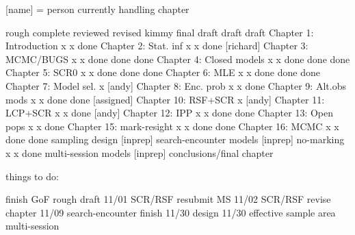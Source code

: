 [name] = person currently handling chapter


                          rough   complete reviewed  revised kimmy final 
                          draft    draft                           draft
Chapter 1: Introduction       x       x     done    
Chapter 2: Stat. inf          x       x     done    [richard]
Chapter 3: MCMC/BUGS          x       x     done     done    done
Chapter 4: Closed models      x       x     done     done    done
Chapter 5: SCR0               x       x     done     done    done
Chapter 6: MLE                x       x     done     done    done
Chapter 7: Model sel.         x     [andy]
Chapter 8: Enc. prob          x       x     done
Chapter 9: Alt.obs mods       x       x     done     done   [assigned]
Chapter 10: RSF+SCR           x    [andy]
Chapter 11: LCP+SCR           x       x     done    [andy]
Chapter 12: IPP               x       x     done     done       
Chapter 13: Open pops         x       x     done 
Chapter 15: mark-resight      x       x     done     done 
Chapter 16: MCMC              x       x     done     done
sampling design            [inprep]
search-encounter models    [inprep]
no-marking                    x       x     done
multi-session models       [inprep]
conclusions/final chapter





things to do:

finish GoF rough draft   11/01
SCR/RSF resubmit MS      11/02
SCR/RSF revise chapter   11/09
search-encounter finish  11/30
design                   11/30
effective sample area  
multi-session
